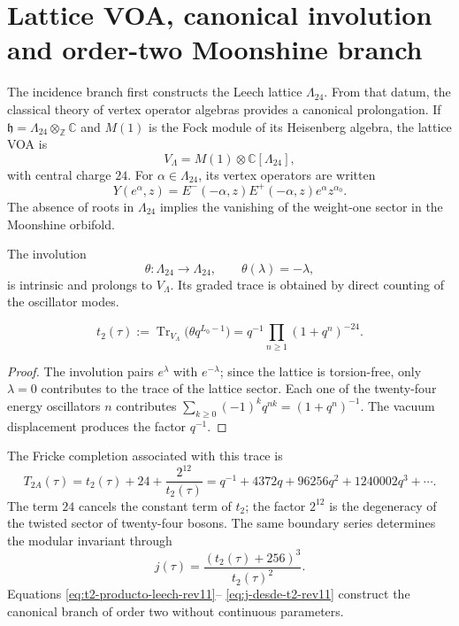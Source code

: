 \section{Lattice VOA, canonical involution and order-two Moonshine branch}
\label{sec:voa-moonshine-orden-dos-rev11}

The incidence branch first constructs the Leech lattice
\(\Lambda_{24}\). From that datum, the classical theory of vertex operator
algebras provides a canonical prolongation. If
\(\mathfrak h=\Lambda_{24}\otimes_{\mathbb Z}\mathbb C\) and \(M(1)\) is
the Fock module of its Heisenberg algebra, the lattice VOA is
\begin{equation}
 V_{\Lambda}=M(1)\otimes\mathbb C[\Lambda_{24}],
 \label{eq:voa-reticular-leech-rev11}
\end{equation}
with central charge \(24\). For \(\alpha\in\Lambda_{24}\), its vertex
operators are written
\[
 Y(e^\alpha,z)=E^-(-\alpha,z)E^+(-\alpha,z)e^\alpha z^{\alpha_0}.
\]
The absence of roots in \(\Lambda_{24}\) implies the vanishing of the
weight-one sector in the Moonshine orbifold.

The involution
\[
 \theta:\Lambda_{24}\longrightarrow\Lambda_{24},
 \qquad \theta(\lambda)=-\lambda,
\]
is intrinsic and prolongs to \(V_{\Lambda}\). Its graded trace is obtained
by direct counting of the oscillator modes.

\begin{theorem}
\label{thm:traza-theta-leech-rev11}
\begin{equation}
 t_2(\tau)
 :=\operatorname{Tr}_{V_\Lambda}
 \bigl(\theta q^{L_0-1}\bigr)
 =q^{-1}\prod_{n\geq1}(1+q^n)^{-24}.
 \label{eq:t2-producto-leech-rev11}
\end{equation}
\end{theorem}
\begin{proof}
The involution pairs \(e^\lambda\) with \(e^{-\lambda}\); since the lattice
is torsion-free, only \(\lambda=0\) contributes to the trace of the
lattice sector. Each one of the twenty-four energy oscillators \(n\) contributes
\(\sum_{k\geq0}(-1)^kq^{nk}=(1+q^n)^{-1}\). The vacuum displacement
produces the factor \(q^{-1}\).
\end{proof}

The Fricke completion associated with this trace is
\begin{equation}
 T_{2A}(\tau)=t_2(\tau)+24+\frac{2^{12}}{t_2(\tau)}
 =q^{-1}+4372q+96256q^2+1240002q^3+\cdots.
 \label{eq:T2A-hmt-rev11}
\end{equation}
The term \(24\) cancels the constant term of \(t_2\); the factor
\(2^{12}\) is the degeneracy of the twisted sector of twenty-four bosons.
The same boundary series determines the modular invariant through
\begin{equation}
 \boxed{j(\tau)=\frac{(t_2(\tau)+256)^3}{t_2(\tau)^2}}.
 \label{eq:j-desde-t2-rev11}
\end{equation}
Equations \eqref{eq:t2-producto-leech-rev11}--
\eqref{eq:j-desde-t2-rev11} construct the canonical branch of order two without
continuous parameters.

